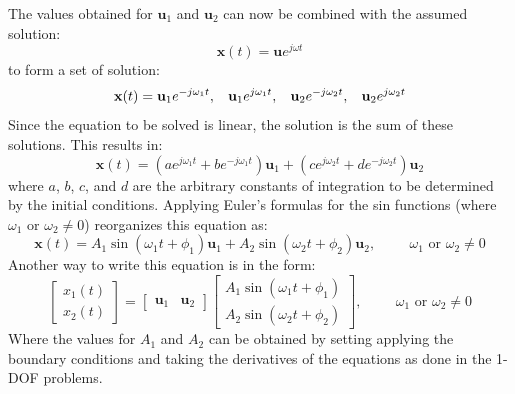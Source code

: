 \documentclass[12pt,letter]{article}
\numberwithin{ex}{section} %
\numberwithin{re}{section} %
\begin{document}
The values obtained for $\mathbf{u}_1$ and $\mathbf{u}_2$ can now be combined with the assumed solution:
\begin{equation}
	\mathbf{x}(t) = \mathbf{u}e^{j\omega t}
\end{equation}
to form a set of solution:
\begin{equation}
	\mathbf{x}(t) = \mathbf{u}_1e^{-j\omega_1 t}, \hspace{2ex} \mathbf{u}_1e^{j\omega_1 t}, \hspace{2ex} \mathbf{u}_2e^{-j\omega_2 t}, \hspace{2ex} \mathbf{u}_2e^{j\omega_2 t}
\end{equation}
Since the equation to be solved is linear, the solution is the sum of these solutions. This results in:
\begin{equation}
	\mathbf{x}(t) = (a e^{j\omega_1 t} + b e^{-j\omega_1 t})\mathbf{u}_1 +(c e^{j\omega_2 t} + d e^{-j\omega_2 t})\mathbf{u}_2
\end{equation}
where $a$, $b$, $c$, and $d$ are the arbitrary constants of integration to be determined by the initial conditions. Applying Euler's formulas for the sin functions (where $\omega_1 \text{ or } \omega_2 \neq 0$) reorganizes this equation as:
\begin{equation}
	\mathbf{x}(t) = A_1 \sin (\omega_1 t + \phi_1 )\mathbf{u}_1 + A_2 \sin (\omega_2 t + \phi_2 )\mathbf{u}_2 , \hspace{1cm} \omega_1 \text{ or } \omega_2 \neq 0
\end{equation}
Another way to write this equation is in the form:
\begin{equation}
	 \begin{bmatrix} x_1(t) \\  x_2(t) \end{bmatrix} =  \begin{bmatrix} \mathbf{u}_1 & \mathbf{u}_2 \end{bmatrix}
	 \begin{bmatrix} A_1 \sin (\omega_1 t + \phi_1 )\\ A_2 \sin (\omega_2 t + \phi_2 )\end{bmatrix}, \hspace{1cm} \omega_1 \text{ or } \omega_2 \neq 0
\end{equation}
Where the values for $A_1$ and $A_2$ can be obtained by setting applying the boundary conditions and taking the derivatives of the equations as done in the 1-DOF problems. 
\end{document}
